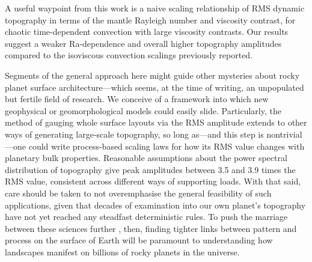 
A useful waypoint from this work is a naive scaling relationship of RMS dynamic topography in terms of the mantle Rayleigh number and viscosity contrast, for chaotic time-dependent convection with large viscosity contrasts. Our results suggest a weaker Ra-dependence and overall higher topography amplitudes compared to the isoviscous convection scalings previously reported. %
 





Segments of the general approach here might guide other mysteries about rocky planet surface architecture---which seems, at the time of writing, an unpopulated but fertile field of research. We conceive of a framework into which new geophysical or geomorphological models could easily slide. Particularly, the method of gauging whole surface layouts via the RMS amplitude extends to other ways of generating large-scale topography, so long as---and this step is nontrivial---one could write process-based scaling laws for how its RMS value changes with planetary bulk properties. Reasonable assumptions about the power spectral distribution of topography give peak amplitudes between 3.5 and 3.9 times the RMS value, consistent across different ways of supporting loads. With that said, care should be taken to not overemphasise the general feasibility of such applications, given that decades of examination into our own planet's topography have not yet reached any steadfast deterministic rules. To push the marriage between these sciences further \citep{shorttle_why_2021}, then, finding tighter links between pattern and process on the surface of Earth will be paramount to understanding how landscapes manifest on billions of rocky planets in the universe.



